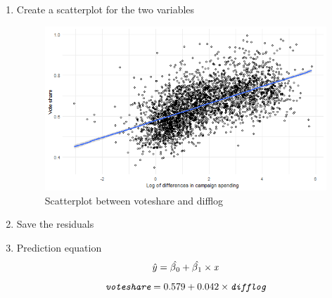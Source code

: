 \documentclass[12pt,letterpaper]{article}
\begin{document}
\begin{enumerate}
		\item Create a scatterplot for the two variables
		
		\begin{figure}[H]\centering
			\caption{\footnotesize Scatterplot between voteshare and difflog}
			\label{fig:plot_1}
			\includegraphics[width=.85\textwidth]{1.2. Scatter_plot_voteshare_difflog.png}
		\end{figure}
	
		\item Save the residuals
		
		
		\item Prediction equation
		$$\hat{y} = \hat{\beta\textsubscript{0}} + \hat{\beta\textsubscript{1}} \times \textit{x} $$
		$$ \textit{\texttt{voteshare}} = 0.579 + 0.042 \times \textit{\texttt{difflog}}$$
	\end{enumerate}
\end{document}
